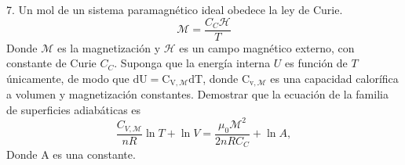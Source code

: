 7. Un mol de un sistema paramagnético ideal obedece la ley de Curie.
$$
\mathscr{M} =\frac{C_{C} \mathscr H}{T}
$$
Donde $\mathscr M$ es la magnetización y $\mathscr H$ es un campo magnético externo, con constante de Curie $C_C$. Suponga que la energía interna $U$ es función de $T$ únicamente, de modo que $\mathrm{dU}=\mathrm{C}_{\mathrm{V},\mathscr M}  \mathrm{dT}$, donde $\mathrm{C}_{\mathrm{v}, \mathscr{M}}$ es una capacidad calorífica a volumen y magnetización constantes. Demostrar que la ecuación de la familia de superficies adiabáticas es
$$
\frac{C_{V, \mathscr M}}{n R} \ln T+\ln V=\frac{\mu_0 \mathscr M^2}{2 n R C_C}+\ln A,
$$
Donde A es una constante.